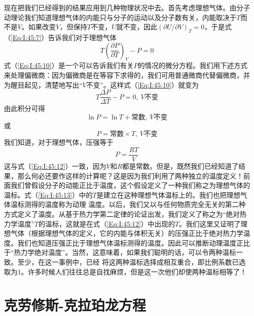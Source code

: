 现在把我们已经得到的结果应用到几种物理状况中去。首先考虑理想气体。由分子动理论我们知道理想气体的内能只与分子的运动以及分子数有关，内能取决于$T$而不是$V$。如果改变$V$，但保持$T$不变，$U$就不变，因此$(\partial U /\partial V)_T =0$，于是式（\ref{Eq:I:45:7}）告诉我们对于理想气体
\begin{equation}
    \label{Eq:I:45:10}
    T\left(\frac{\partial P}{\partial T}\right)_V - P = 0
\end{equation}
式（\ref{Eq:I:45:10}）是一个可以告诉我们有关$P$的情况的微分方程。我们用下述方式来处理偏微商：因为偏微商是在等容下求得的，我们可用普通微商代替偏微商，并为醒目起见，清楚地写出“$V$不变”。这样式（\ref{Eq:I:45:10}）就变为
\begin{equation}
    \label{Eq:I:45:11}
    T\frac{\Delta P}{\Delta T} - P = 0,~V\text{不变}
\end{equation}
由此积分可得
\begin{equation*}
    \ln P = \ln T + \text{常数},~V\text{不变}
\end{equation*}
或
\begin{equation}
    \label{Eq:I:45:12}
    P=\text{常数}\times T,~V\text{不变}
\end{equation}
我们知道，对于理想气体，压强等于
\begin{equation}
    \label{Eq:I:45:13}
    P = \frac{RT}{V}
\end{equation}
这与式（\ref{Eq:I:45:12}）一致，因为$V$和$R$都是常数。但是，既然我们已经知道了结果，那么何必还要作这样的计算呢？这是因为我们利用了两种独立的温度定义！前面我们曾假设分子的动能正比于温度，这个假设定义了一种我们称之为理想气体的温标。式（\ref{Eq:I:45:13}）中的$T$是建立在这种理想气体温标上的。我们也把理想气体温标测得的温度称为动理 温度。以后，我们又以与任何物质完全无关的第二种方式定义了温度。从基于热力学第二定律的论证出发，我们定义了称之为“绝对热力学温度”$T$的温标，这就是在式（\ref{Eq:I:45:12}）中出现的$T$。我们这里又证明了理想气体（根据理想气体的定义，它的内能与体积无关）的压强正比于绝对热力学温度。我们也知道压强正比于理想气体温标测得的温度。因此可以推断动理温度正比于“热力学绝对温度”。当然，这意味着，如果我们聪明的话，可以令两种温标一致。至少，在这一事例中，已经 将这两种温标选择成相互重合，即比例系数已选取为1。许多时候人们往往总是自找麻烦，但是这一次他们却使两种温标相等了！

\section{克劳修斯-克拉珀龙方程}

